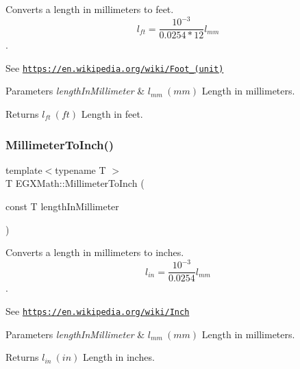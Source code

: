 Converts a length in millimeters to feet. \[ l_{ft}= \frac{10^{-3}}{0.0254 * 12} l_{mm} \]. 

See \href{https://en.wikipedia.org/wiki/Foot_(unit)}{\tt https\+://en.\+wikipedia.\+org/wiki/\+Foot\+\_\+(unit)} 
\begin{DoxyParams}{Parameters}
{\em length\+In\+Millimeter} & $ l_{mm}\ (mm)$ Length in millimeters. \\
\hline
\end{DoxyParams}
\begin{DoxyReturn}{Returns}
$ l_{ft}\ (ft)$ Length in feet. 
\end{DoxyReturn}
\mbox{\label{group___e_g_x_math-_conversions-_length_conversions-_s_i-_millimeter-_imperial_gaaf0d8029c38ed975edf3805a0a3a53f7}} 
\subsubsection{\texorpdfstring{Millimeter\+To\+Inch()}{MillimeterToInch()}}
{\footnotesize\ttfamily template$<$typename T $>$ \\
T E\+G\+X\+Math\+::\+Millimeter\+To\+Inch (\begin{DoxyParamCaption}\item[{const T}]{length\+In\+Millimeter }\end{DoxyParamCaption})}



Converts a length in millimeters to inches. \[ l_{in}= \frac{10^{-3}}{0.0254} l_{mm} \]. 

See \href{https://en.wikipedia.org/wiki/Inch}{\tt https\+://en.\+wikipedia.\+org/wiki/\+Inch} 
\begin{DoxyParams}{Parameters}
{\em length\+In\+Millimeter} & $ l_{mm}\ (mm)$ Length in millimeters. \\
\hline
\end{DoxyParams}
\begin{DoxyReturn}{Returns}
$ l_{in}\ (in)$ Length in inches. 
\end{DoxyReturn}
\mbox{\label{group___e_g_x_math-_conversions-_length_conversions-_s_i-_millimeter-_imperial_gaf811317f4ce575df4ff0329491e92fac}} 
